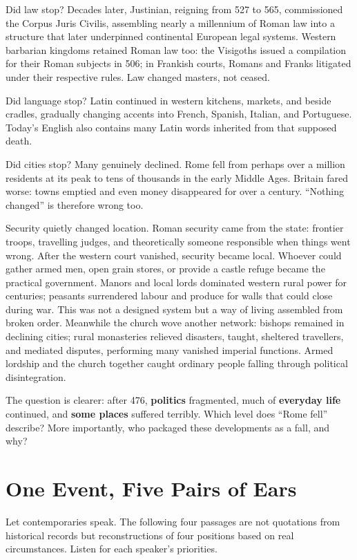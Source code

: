 Did law stop? Decades later, Justinian, reigning from 527 to 565, commissioned the Corpus Juris Civilis, assembling nearly a millennium of Roman law into a structure that later underpinned continental European legal systems. Western barbarian kingdoms retained Roman law too: the Visigoths issued a compilation for their Roman subjects in 506; in Frankish courts, Romans and Franks litigated under their respective rules. Law changed masters, not ceased.

Did language stop? Latin continued in western kitchens, markets, and beside cradles, gradually changing accents into French, Spanish, Italian, and Portuguese. Today's English also contains many Latin words inherited from that supposed death.

Did cities stop? Many genuinely declined. Rome fell from perhaps over a million residents at its peak to tens of thousands in the early Middle Ages. Britain fared worse: towns emptied and even money disappeared for over a century. ``Nothing changed'' is therefore wrong too.

Security quietly changed location. Roman security came from the state: frontier troops, travelling judges, and theoretically someone responsible when things went wrong. After the western court vanished, security became local. Whoever could gather armed men, open grain stores, or provide a castle refuge became the practical government. Manors and local lords dominated western rural power for centuries; peasants surrendered labour and produce for walls that could close during war. This was not a designed system but a way of living assembled from broken order. Meanwhile the church wove another network: bishops remained in declining cities; rural monasteries relieved disasters, taught, sheltered travellers, and mediated disputes, performing many vanished imperial functions. Armed lordship and the church together caught ordinary people falling through political disintegration.

The question is clearer: after 476, \textbf{politics} fragmented, much of \textbf{everyday life} continued, and \textbf{some places} suffered terribly. Which level does ``Rome fell'' describe? More importantly, who packaged these developments as a fall, and why?

\section{One Event, Five Pairs of Ears}
Let contemporaries speak. The following four passages are not quotations from historical records but reconstructions of four positions based on real circumstances. Listen for each speaker's priorities.

